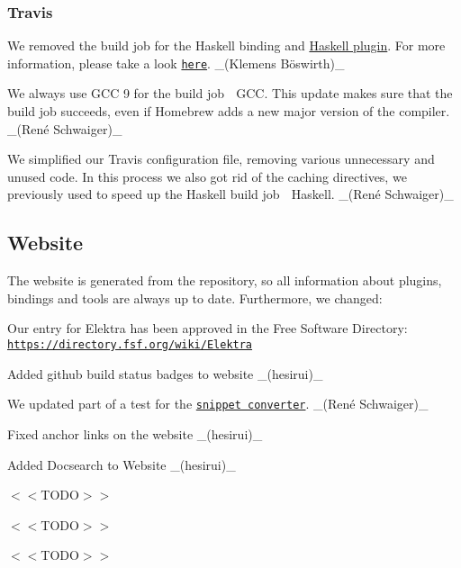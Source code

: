 \subsubsection*{Travis}


\begin{DoxyItemize}
\item We removed the build job for the Haskell binding and \hyperlink{md_src_plugins_haskell_README_src_plugins_haskell_README_md}{Haskell plugin}. For more information, please take a look \href{https://issues.libelektra.org/2751}{\tt here}. \+\_\+(Klemens Böswirth)\+\_\+
\item We always use G\+CC 9 for the build job {\ttfamily 🍏 G\+CC}. This update makes sure that the build job succeeds, even if Homebrew adds a new major version of the compiler. \+\_\+(René Schwaiger)\+\_\+
\item We simplified our Travis configuration file, removing various unnecessary and unused code. In this process we also got rid of the caching directives, we previously used to speed up the Haskell build job {\ttfamily 🍏 Haskell}. \+\_\+(René Schwaiger)\+\_\+
\end{DoxyItemize}

\subsection*{Website}

The website is generated from the repository, so all information about plugins, bindings and tools are always up to date. Furthermore, we changed\+:


\begin{DoxyItemize}
\item Our entry for Elektra has been approved in the Free Software Directory\+: \href{https://directory.fsf.org/wiki/Elektra}{\tt https\+://directory.\+fsf.\+org/wiki/\+Elektra}
\item Added github build status badges to website \+\_\+(hesirui)\+\_\+
\item We updated part of a test for the \href{https://www.libelektra.org/conversion}{\tt snippet converter}. \+\_\+(René Schwaiger)\+\_\+
\item Fixed anchor links on the website \+\_\+(hesirui)\+\_\+
\item Added Docsearch to Website \+\_\+(hesirui)\+\_\+
\item $<$$<$\+T\+O\+D\+O$>$$>$
\item $<$$<$\+T\+O\+D\+O$>$$>$
\item $<$$<$\+T\+O\+D\+O$>$$>$
\end{DoxyItemize}

